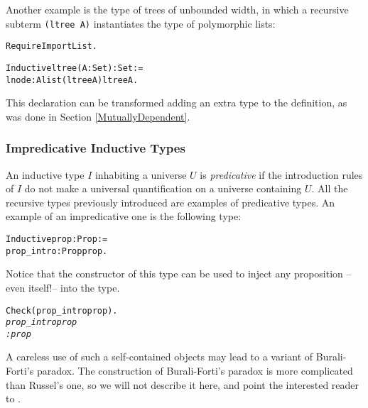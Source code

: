 \documentclass[11pt]{article}
\begin{document}
Another example is the type of trees
 of unbounded width, in which a recursive subterm
\texttt{(ltree A)} instantiates the type  of polymorphic lists:

\begin{alltt}
Require Import List.

Inductive ltree  (A:Set) : Set :=
          lnode   : A {\arrow} list (ltree A) {\arrow} ltree A.
\end{alltt}

This declaration can be transformed
adding an extra type to the definition, as was done in Section
\ref{MutuallyDependent}.


\subsubsection{Impredicative Inductive Types}

An inductive type $I$ inhabiting a universe $U$ is \textsl{predicative}
if the introduction rules of $I$ do not make a universal
quantification on a universe containing $U$. All the recursive types
previously introduced are examples of predicative types. An example of
an impredicative one is the following type:



\begin{alltt}
Inductive prop : Prop :=
 prop_intro : Prop {\arrow} prop.
\end{alltt}

Notice
that the constructor of this type can be used to inject any
proposition --even itself!-- into the type.

\begin{alltt}
Check (prop_intro prop).\it
prop_intro prop
     : prop
\end{alltt}

A careless use of such a
self-contained objects may lead to a variant of Burali-Forti's
paradox. The construction of Burali-Forti's paradox is more
complicated than Russel's one, so we will not describe it here, and
point the interested reader to \cite{Bar98,Coq86}.
\end{document}
